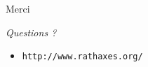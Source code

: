 \documentclass{beamer}
\begin{document}
\begin{frame}{Merci}
\begin{center}
\Huge{\emph{Questions ?}}
\end{center}

\vspace{2em}
\begin{itemize}
\item \Large{\texttt{http://www.rathaxes.org/}}
\end{itemize}
\end{frame}
\end{document}
